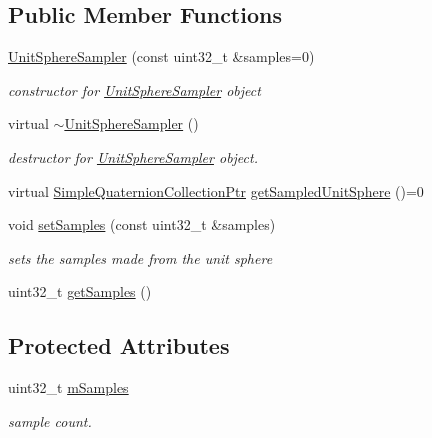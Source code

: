 \subsection*{\-Public \-Member \-Functions}
\begin{DoxyCompactItemize}
\item 
\hyperlink{classnext__best__view_1_1UnitSphereSampler_aa4be416134b3cc27faaf5f53edccd4df}{\-Unit\-Sphere\-Sampler} (const uint32\-\_\-t \&samples=0)
\begin{DoxyCompactList}\small\item\em constructor for \hyperlink{classnext__best__view_1_1UnitSphereSampler}{\-Unit\-Sphere\-Sampler} object \end{DoxyCompactList}\item 
virtual \hyperlink{classnext__best__view_1_1UnitSphereSampler_adbec4e638ac825ef8c8c070a313653cc}{$\sim$\-Unit\-Sphere\-Sampler} ()
\begin{DoxyCompactList}\small\item\em destructor for \hyperlink{classnext__best__view_1_1UnitSphereSampler}{\-Unit\-Sphere\-Sampler} object. \end{DoxyCompactList}\item 
virtual \*
\hyperlink{namespacenext__best__view_a56eab77c28120ee9265ea6fa82a4a3c5}{\-Simple\-Quaternion\-Collection\-Ptr} \hyperlink{classnext__best__view_1_1UnitSphereSampler_a26213308b4c1047cc5a97d38a6990543}{get\-Sampled\-Unit\-Sphere} ()=0
\item 
void \hyperlink{classnext__best__view_1_1UnitSphereSampler_a20d8f05355cbd9c3d427b583028215c3}{set\-Samples} (const uint32\-\_\-t \&samples)
\begin{DoxyCompactList}\small\item\em sets the samples made from the unit sphere \end{DoxyCompactList}\item 
uint32\-\_\-t \hyperlink{classnext__best__view_1_1UnitSphereSampler_ade97a73b739e493925b7e042e8b0b39a}{get\-Samples} ()
\end{DoxyCompactItemize}
\subsection*{\-Protected \-Attributes}
\begin{DoxyCompactItemize}
\item 
uint32\-\_\-t \hyperlink{classnext__best__view_1_1UnitSphereSampler_a926d76c0fcf55cef95f506d82ef92e9b}{m\-Samples}
\begin{DoxyCompactList}\small\item\em sample count. \end{DoxyCompactList}\end{DoxyCompactItemize}


